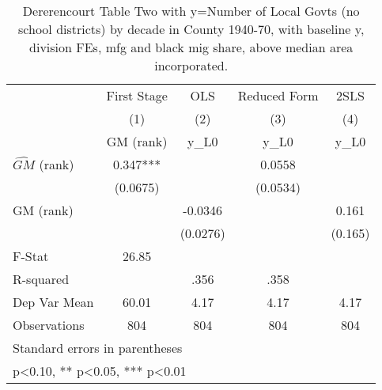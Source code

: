 \begin{table}[htbp]\centering
\def\sym#1{\ifmmode^{#1}\else\(^{#1}\)\fi}
\caption{Dererencourt Table Two with y=Number of Local Govts (no school districts) by decade in County 1940-70, with baseline y, division FEs, mfg and black mig share, above median area incorporated.}
\begin{tabular}{l*{4}{c}}
\toprule
                    & First Stage   &         OLS   &Reduced Form   &        2SLS   \\
                    &\multicolumn{1}{c}{(1)}&\multicolumn{1}{c}{(2)}&\multicolumn{1}{c}{(3)}&\multicolumn{1}{c}{(4)}\\
                    &\multicolumn{1}{c}{GM  (rank)}&\multicolumn{1}{c}{y\_L0}&\multicolumn{1}{c}{y\_L0}&\multicolumn{1}{c}{y\_L0}\\
\midrule
$\hat{GM}$ (rank)   &       0.347***&               &      0.0558   &               \\
                    &    (0.0675)   &               &    (0.0534)   &               \\
\addlinespace
GM  (rank)          &               &     -0.0346   &               &       0.161   \\
                    &               &    (0.0276)   &               &     (0.165)   \\
\midrule
F-Stat              &       26.85   &               &               &               \\
R-squared           &               &        .356   &        .358   &               \\
Dep Var Mean        &       60.01   &        4.17   &        4.17   &        4.17   \\
Observations        &         804   &         804   &         804   &         804   \\
\bottomrule
\multicolumn{5}{l}{\footnotesize Standard errors in parentheses}\\
\multicolumn{5}{l}{\footnotesize * p<0.10, ** p<0.05, *** p<0.01}\\
\end{tabular}
\end{table}
